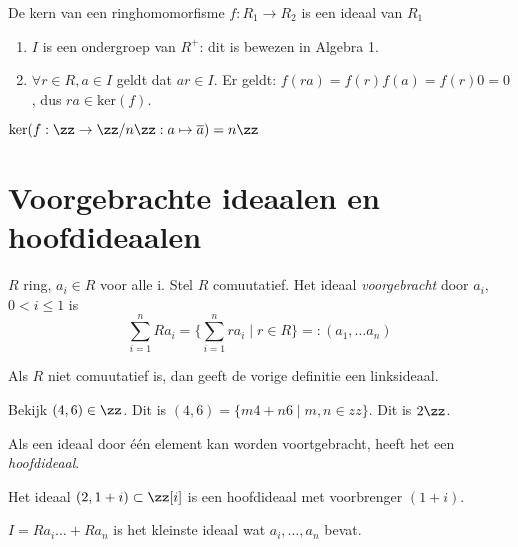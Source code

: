 \documentclass[a4paper,12pt,oneside]{book}
\begin{document}
\begin{stelling}
 De kern van een ringhomomorfisme $f : R_1 \to R_2$ is een ideaal van $R_1$
\end{stelling}
\begin{bewijs}
\begin{enumerate}[label=(I\arabic*)]
\item $I$ is een ondergroep van $R^+$: dit is bewezen in Algebra 1.
\item $\forall r \in R, a \in I$ geldt dat $ar \in I$. Er geldt: $f(ra) = f(r)f(a) = f(r)0 = 0$, dus $ra \in \mathrm{ker}(f)$.
\end{enumerate}
\end{bewijs}

\begin{voorbeeld}
$\mathrm{ker}(f : \zz \to \zz/n\zz : a \mapsto \overline{a}) = n \zz$
\end{voorbeeld}

\section{Voorgebrachte ideaalen en hoofdideaalen}

\begin{definitie}
$R$ ring, $a_i \in R$ voor alle i. Stel $R$ comuutatief. Het ideaal \textit{voorgebracht} door $a_i$, $0 < i \le 1$ is 
\[
\sum_{i=1}^n Ra_i = \{ \sum_{i=1}^n ra_i \mid r \in R\} =: (a_1, \ldots a_n)
\]
\end{definitie}

\begin{opmerking}
Als $R$ niet comuutatief is, dan geeft de vorige definitie een linksideaal.
\end{opmerking}

\begin{voorbeeld}
Bekijk $(4, 6) \in \zz$. Dit is $(4, 6)= \{m4 + n6 \mid m, n \in zz\}$. Dit is $2\zz$. 
\end{voorbeeld}

\begin{definitie}
Als een ideaal door \'e\'en element kan worden voortgebracht, heeft het een \textit{hoofdideaal}.
\end{definitie}

\begin{voorbeeld}
Het ideaal $(2,1+i) \subset \zz[i]$ is een hoofdideaal met voorbrenger $(1+i)$. 
\end{voorbeeld}

\begin{opmerking}
$I = Ra_i \ldots + Ra_n$ is het kleinste ideaal wat  $a_i, \ldots, a_n$  bevat.
\end{opmerking}
\end{document}
